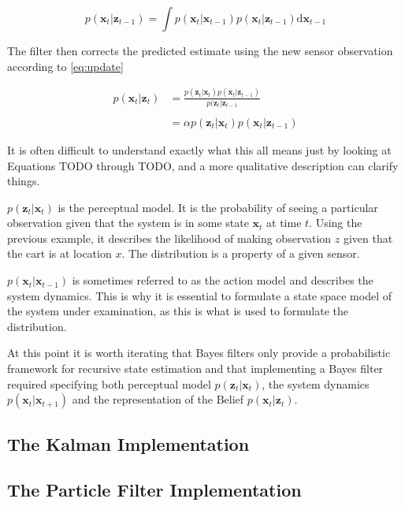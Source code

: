 \begin{equation}\label{bayes-predict}
p(\mathbf{x}_{t} | \mathbf{z}_{t-1}) = \int{p(\mathbf{x}_{t} | \mathbf{x}_{t-1})
p(\mathbf{x}_{t} | \mathbf{z}_{t-1})\mathrm{d}\mathbf{x}_{t-1}}
\end{equation}

The filter then corrects the predicted estimate using the new sensor observation
according to \ref{eq:update}

\begin{align}\label{bayes-update}
    p(\mathbf{x}_{t} | \mathbf{z}_{t}) &=
    \frac
    {p(\mathbf{z}_{t} | \mathbf{x}_{t})p(\mathbf{x}_{t} | \mathbf{z}_{t-1})}
    {p(\mathbf{z}_{t} | \mathbf{z}_{t-1}}\\\\
    &=
    \alpha p(\mathbf{z}_{t} | \mathbf{x}_{t})p(\mathbf{x}_{t} | \mathbf{z}_{t-1})
\end{align}


It is often difficult to understand exactly what this all means just by looking at
Equations TODO through TODO, and a more qualitative description can clarify things.

$p(\mathbf{z}_{t} | \mathbf{x}_{t})$ is the perceptual model. It is the probability
of seeing a particular observation given that the system is in some state
$\mathbf{x}_{t}$ at time $t$. Using the previous example, it describes the
likelihood of making observation $z$ given that the cart is at location $x$.
The distribution is a property of a given sensor.


$p(\mathbf{x}_{t} | \mathbf{x}_{t-1})$ is sometimes referred to as the action
model and describes the system dynamics. This is why it is essential to formulate
a state space model of the system under examination, as this is what is used to
formulate the distribution.

At this point it is worth iterating that Bayes filters only provide a
probabilistic framework for recursive state estimation and that implementing
a Bayes filter required specifying both perceptual model
$p(\mathbf{z}_{t} | \mathbf{x}_{t})$, the system dynamics
$p(\mathbf{x}_{t} | \mathbf{x}_{t+1})$ and the representation of the Belief
$p(\mathbf{x}_{t} | \mathbf{z}_{t})$.

\subsection{The Kalman Implementation}

\subsection{The Particle Filter Implementation}

    
